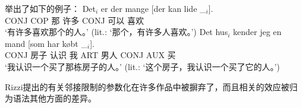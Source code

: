 \citet[]{Erteschik73a-u}举出了如下的例子：
\eal
\label{Beispiel-Extraktion-Adjunkt}
\ex
\gll Det$_i$ er   der mange [der kan lide \_$_i$].\\
     CONJ COP 那  许多 \hspaceThis{[}CONJ 可以 喜欢\\
\glt `有许多喜欢那个的人。' (lit.: `那个，有许多人喜欢。')
\ex
\gll Det    hus$_i$  kender jeg en    mand [som har købt \_$_i$].\\
     CONJ   房子  认识  我 ART 男人 \hspaceThis{[}CONJ AUX 买\\
\glt `我认识一个买了那栋房子的人。' (lit.: `这个房子，我认识一个买了它的人。')
\zl

Rizzi提出的有关邻接限制的参数化在许多作品中被摒弃了，而且相关的效应被归为语法其他方面的差异\citep{Adams84a,CMC83a,Grimshaw86b,Kluender92a}。

